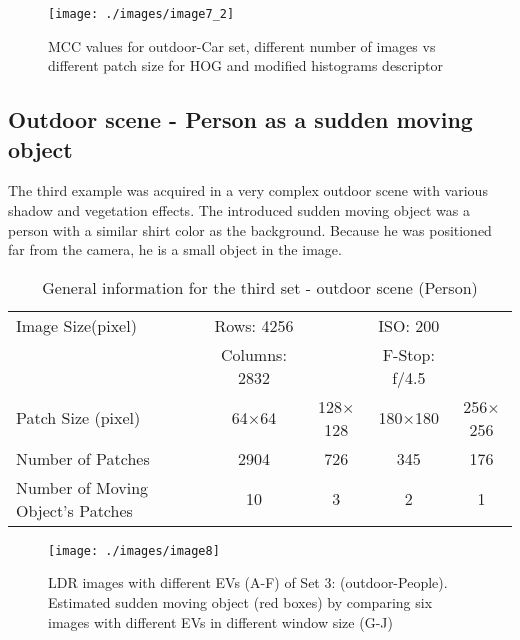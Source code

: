 \documentclass[preprint,12pt,3p]{elsarticle}
\begin{document}
\begin{figure}[H]
\centering
\texttt{[image: ./images/image7\_2]}
\caption{MCC values for outdoor-Car set, different number of images vs different patch size for HOG and modified histograms descriptor}
\label{fig:image7_2}
\end{figure}

\subsection{Outdoor scene - Person as a sudden moving object}

The third example was acquired in a very complex outdoor scene with various shadow and vegetation effects.  The introduced sudden moving object was a person with a similar shirt color as the background. Because he was positioned far from the camera, he is a small object in the image. \\

\begin{table}[h]
  \centering
  \caption{General information for the third set - outdoor scene (Person)}
    \begin{tabular}{l|cccc}
    \hline
    Image Size(pixel) & Rows: 4256 & & ISO: 200  \\
          & Columns: 2832 &  & F-Stop: f/4.5  \\
                  \hline
    Patch Size (pixel) & \multicolumn{1}{c}{64$\times$64} & \multicolumn{1}{c}{128$\times$128} & \multicolumn{1}{c}{180$\times$180} & \multicolumn{1}{c}{256$\times$256} \\
        \hline
    Number of Patches & \multicolumn{1}{c}{2904} & \multicolumn{1}{c}{726} & \multicolumn{1}{c}{345} & \multicolumn{1}{c}{176} \\
    Number of Moving Object's Patches & \multicolumn{1}{c}{10} & \multicolumn{1}{c}{3} & \multicolumn{1}{c}{2} & \multicolumn{1}{c}{1} \\
    \end{tabular}%
  \label{tab:set3}%
\end{table}%

\begin{figure}[H]
\centering
\texttt{[image: ./images/image8]}
\caption{LDR images with different EVs (A-F) of Set 3: (outdoor-People). Estimated sudden moving object (red boxes) by comparing six images with different EVs in different window size (G-J)}
\label{fig:image8_1}
\end{figure}
\end{document}
